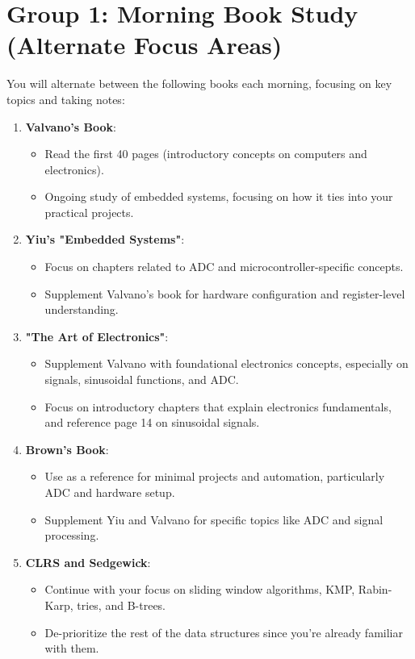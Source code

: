 \documentclass{article}
\begin{document}
\section*{Group 1: Morning Book Study (Alternate Focus Areas)}

You will alternate between the following books each morning, focusing on key topics and taking notes:

\begin{enumerate}
    \item \textbf{Valvano’s Book}:
    \begin{itemize}
        \item Read the first 40 pages (introductory concepts on computers and electronics).
        \item Ongoing study of embedded systems, focusing on how it ties into your practical projects.
    \end{itemize}

    \item \textbf{Yiu’s "Embedded Systems"}:
    \begin{itemize}
        \item Focus on chapters related to ADC and microcontroller-specific concepts.
        \item Supplement Valvano's book for hardware configuration and register-level understanding.
    \end{itemize}

    \item \textbf{"The Art of Electronics"}:
    \begin{itemize}
        \item Supplement Valvano with foundational electronics concepts, especially on signals, sinusoidal functions, and ADC.
        \item Focus on introductory chapters that explain electronics fundamentals, and reference page 14 on sinusoidal signals.
    \end{itemize}

    \item \textbf{Brown’s Book}:
    \begin{itemize}
        \item Use as a reference for minimal projects and automation, particularly ADC and hardware setup.
        \item Supplement Yiu and Valvano for specific topics like ADC and signal processing.
    \end{itemize}

    \item \textbf{CLRS and Sedgewick}:
    \begin{itemize}
        \item Continue with your focus on sliding window algorithms, KMP, Rabin-Karp, tries, and B-trees.
        \item De-prioritize the rest of the data structures since you're already familiar with them.
    \end{itemize}
\end{enumerate}
\end{document}
